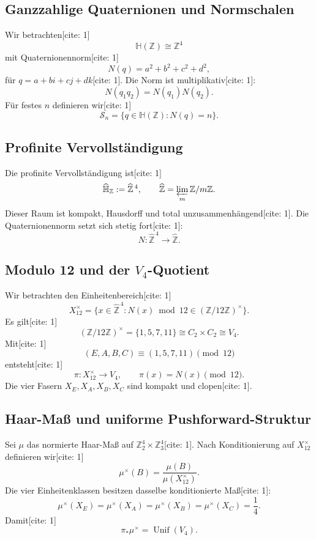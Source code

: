 \documentclass[11pt,a4paper]{article}
\newcommand{\HH}{\mathbb{H}}
\newcommand{\ZZ}{\mathbb{Z}}
\newcommand{\Unif}{\operatorname{Unif}}
\begin{document}
\subsection{Ganzzahlige Quaternionen und Normschalen}
Wir betrachten[cite: 1]
\[
\HH(\ZZ)\cong\ZZ^4
\]
mit Quaternionennorm[cite: 1]
\[
N(q)=a^2+b^2+c^2+d^2,
\]
für $q=a+bi+cj+dk$[cite: 1]. Die Norm ist multiplikativ[cite: 1]:
\[
\boxed{N(q_1q_2)=N(q_1)N(q_2).}
\]
Für festes $n$ definieren wir[cite: 1]
\[
\mathcal S_n=\{q\in\HH(\ZZ):N(q)=n\}.
\]

\subsection{Profinite Vervollständigung}
Die profinite Vervollständigung ist[cite: 1]
\[
\widehat{\HH}_{\ZZ}:=\widehat{\ZZ}^{\,4},\qquad
\widehat{\ZZ}=\varprojlim_m\ZZ/m\ZZ.
\]
Dieser Raum ist kompakt, Hausdorff und total unzusammenhängend[cite: 1]. Die Quaternionennorm setzt sich stetig fort[cite: 1]:
\[
N:\widehat{\ZZ}^{\,4}\to\widehat{\ZZ}.
\]

\subsection{Modulo 12 und der $V_4$-Quotient}
Wir betrachten den Einheitenbereich[cite: 1]
\[
X_{12}^{\times}
=
\{x\in\widehat{\ZZ}^{\,4}:N(x)\bmod 12\in(\ZZ/12\ZZ)^\times\}.
\]
Es gilt[cite: 1]
\[
(\ZZ/12\ZZ)^\times=\{1,5,7,11\}\cong C_2\times C_2\cong V_4.
\]
Mit[cite: 1]
\[
(E,A,B,C)\equiv(1,5,7,11)\pmod{12}
\]
entsteht[cite: 1]
\[
\pi:X_{12}^{\times}\to V_4,\qquad \pi(x)=N(x)\pmod{12}.
\]
Die vier Fasern $X_E,X_A,X_B,X_C$ sind kompakt und clopen[cite: 1].

\subsection{Haar-Maß und uniforme Pushforward-Struktur}
Sei $\mu$ das normierte Haar-Maß auf $\ZZ_2^4\times\ZZ_3^4$[cite: 1]. Nach Konditionierung auf $X_{12}^{\times}$ definieren wir[cite: 1]
\[
\mu^\times(B)=\frac{\mu(B)}{\mu(X_{12}^{\times})}.
\]
Die vier Einheitenklassen besitzen dasselbe konditionierte Maß[cite: 1]:
\[
\mu^\times(X_E)=\mu^\times(X_A)=\mu^\times(X_B)=\mu^\times(X_C)=\frac14.
\]
Damit[cite: 1]
\[
\boxed{\pi_*\mu^\times=\Unif(V_4).}
\]
\end{document}
